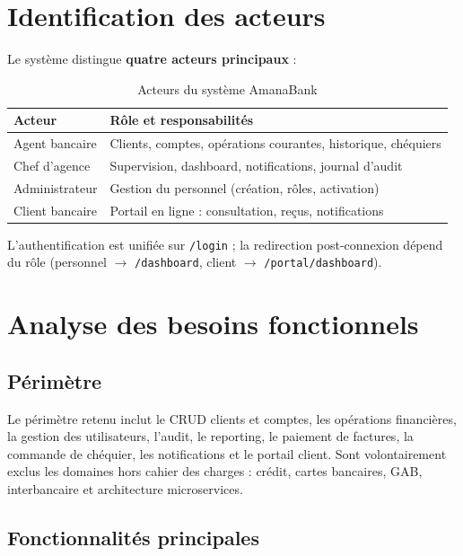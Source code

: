 \documentclass[11pt,a4paper,oneside]{report}
\newcommand{\nomapplication}{AmanaBank}
\begin{document}
\section{Identification des acteurs}

Le système distingue \textbf{quatre acteurs principaux} :

\begin{table}[H]
    \centering
    \caption{Acteurs du système \nomapplication}
    \label{tab:acteurs}
    \begin{tabular}{@{}lp{9cm}@{}}
        \rowcolor{AmanaBrown}
        \color{white}\textbf{Acteur} & \textbf{Rôle et responsabilités} \\
        \midrule
        Agent bancaire & Clients, comptes, opérations courantes, historique, chéquiers \\
        Chef d'agence & Supervision, dashboard, notifications, journal d'audit \\
        Administrateur & Gestion du personnel (création, rôles, activation) \\
        Client bancaire & Portail en ligne : consultation, reçus, notifications \\
        \bottomrule
    \end{tabular}
\end{table}

L'authentification est unifiée sur \texttt{/login} ; la redirection post-connexion dépend du rôle (personnel $\rightarrow$ \texttt{/dashboard}, client $\rightarrow$ \texttt{/portal/dashboard}).

\section{Analyse des besoins fonctionnels}

\subsection{Périmètre}

Le périmètre retenu inclut le CRUD clients et comptes, les opérations financières, la gestion des utilisateurs, l'audit, le reporting, le paiement de factures, la commande de chéquier, les notifications et le portail client. Sont volontairement exclus les domaines hors cahier des charges : crédit, cartes bancaires, GAB, interbancaire et architecture microservices.

\subsection{Fonctionnalités principales}
\end{document}
